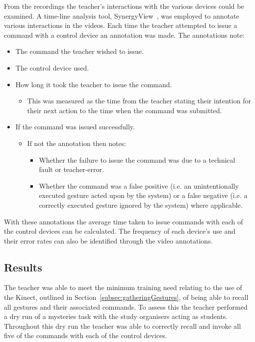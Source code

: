 \documentclass[link]{IWCOMP}
\begin{document}
From the recordings the teacher's interactions with the various devices could be examined.
A time-line analysis tool, SynergyView~\cite{Kyaw2011}, was employed to annotate various interactions in the videos.
Each time the teacher attempted to issue a command with a control device an annotation was made.
The annotations note:
\begin{itemize}
\item The command the teacher wished to issue.
\item The control device used.
\item How long it took the teacher to issue the command.
\begin{itemize}
\item This was measured as the time from the teacher stating their intention for their next action to the time when the command was submitted.
\end{itemize}
\item If the command was issued successfully.
\begin{itemize}
\item If not the annotation then notes:
\begin{itemize}
\item Whether the failure to issue the command was due to a technical fault or teacher-error.
\item Whether the command was a false positive (i.e. an unintentionally executed gesture acted upon by the system) or a false negative (i.e. a correctly executed gesture ignored by the system) where applicable.\\
\end{itemize}
\end{itemize}
\end{itemize}
With these annotations the average time taken to issue commands with each of the control devices can be calculated.
The frequency of each device's use and their error rates can also be identified through the video annotations.

\subsection{Results}
\label{subsec:pilotStudyResults}


The teacher was able to meet the minimum training need relating to the use of the Kinect, outlined in Section~\ref{subsec:gatheringGestures}, of being able to recall all gestures and their associated commands.
To assess this the teacher performed a dry run of a mysteries task with the study organisers acting as students.
Throughout this dry run the teacher was able to correctly recall and invoke all five of the commands with each of the control devices.
\end{document}
